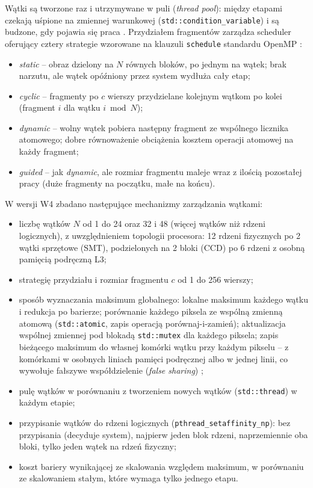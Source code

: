 \documentclass[12pt,a4paper]{article}
\newcommand{\kod}[1]{\texttt{#1}}
\begin{document}
Wątki są tworzone raz i utrzymywane w puli (\emph{thread pool}): między etapami czekają uśpione na zmiennej warunkowej (\kod{std::condition\_variable}) i są budzone, gdy pojawia się praca \cite{karbowski,williams}. Przydziałem fragmentów zarządza scheduler oferujący cztery strategie wzorowane na klauzuli \kod{schedule} standardu OpenMP \cite{openmp}:
\begin{itemize}
	\item \emph{static} -- obraz dzielony na $N$ równych bloków, po jednym na wątek; brak narzutu, ale wątek opóźniony przez system wydłuża cały etap;
	\item \emph{cyclic} -- fragmenty po $c$ wierszy przydzielane kolejnym wątkom po kolei (fragment $i$ dla wątku $i \bmod N$);
	\item \emph{dynamic} -- wolny wątek pobiera następny fragment ze wspólnego licznika atomowego; dobre równoważenie obciążenia kosztem operacji atomowej na każdy fragment;
	\item \emph{guided} -- jak \emph{dynamic}, ale rozmiar fragmentu maleje wraz z ilością pozostałej pracy (duże fragmenty na początku, małe na końcu).
\end{itemize}

W wersji W4 zbadano następujące mechanizmy zarządzania wątkami:
\begin{itemize}
	\item liczbę wątków $N$ od 1 do 24 oraz 32 i 48 (więcej wątków niż rdzeni logicznych), z uwzględnieniem topologii procesora: 12 rdzeni fizycznych po 2 wątki sprzętowe (SMT), podzielonych na 2 bloki (CCD) po 6 rdzeni z osobną pamięcią podręczną L3;
	\item strategię przydziału i rozmiar fragmentu $c$ od 1 do 256 wierszy;
	\item sposób wyznaczania maksimum globalnego: lokalne maksimum każdego wątku i redukcja po barierze; porównanie każdego piksela ze wspólną zmienną atomową (\kod{std::atomic}, zapis operacją porównaj-i-zamień); aktualizacja wspólnej zmiennej pod blokadą \kod{std::mutex} dla każdego piksela; zapis bieżącego maksimum do własnej komórki wątku przy każdym pikselu -- z komórkami w osobnych liniach pamięci podręcznej albo w jednej linii, co wywołuje fałszywe współdzielenie (\emph{false sharing}) \cite{drepper};
	\item pulę wątków w porównaniu z tworzeniem nowych wątków (\kod{std::thread}) w każdym etapie;
	\item przypisanie wątków do rdzeni logicznych (\kod{pthread\_setaffinity\_np}): bez przypisania (decyduje system), najpierw jeden blok rdzeni, naprzemiennie oba bloki, tylko jeden wątek na rdzeń fizyczny;
	\item koszt bariery wynikającej ze skalowania względem maksimum, w porównaniu ze skalowaniem stałym, które wymaga tylko jednego etapu.
\end{itemize}
\end{document}
